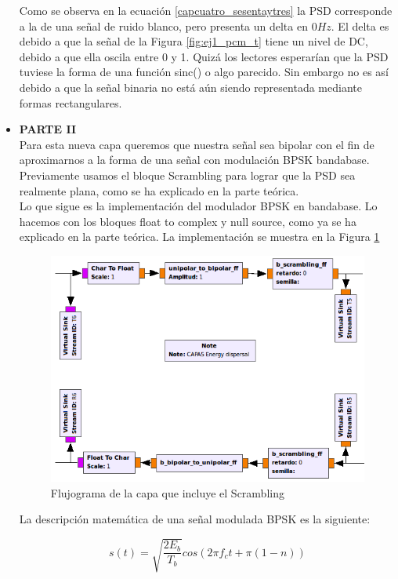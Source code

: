 \begin{itemize}
Como se observa en la ecuación \ref{capcuatro_sesentaytres} la PSD corresponde a la de una señal de ruido blanco, pero presenta un delta en $0 Hz$. El delta es debido a que la señal de la Figura \ref{fig:ej1_pcm_t} tiene un nivel de DC, debido a que ella oscila entre 0 y 1. Quizá los lectores esperarían que la PSD tuviese la forma de una función sinc() o algo parecido. Sin embargo no es así debido a que la señal binaria no está aún siendo representada mediante formas rectangulares.

\item \textbf{PARTE II}\\

Para esta nueva capa queremos que nuestra señal sea bipolar con el fin de aproximarnos a la forma de una señal con modulación BPSK bandabase. Previamente usamos el bloque Scrambling para lograr que la PSD sea realmente plana, como se ha explicado en la parte teórica. \\
Lo que sigue es la implementación del modulador BPSK en bandabase. Lo hacemos con los bloques float to complex y null source, como ya se ha explicado en la parte teórica. La implementación se muestra en la Figura \ref{fig:ej1_bpsk_flujo}\\

\vspace{200px}
\begin{figure}[h!]
	\captionsetup{justification = raggedright, singlelinecheck = false}
	\caption{Flujograma de la capa que incluye el Scrambling}
	\label{fig:ej1_bpsk_flujo}
    \includegraphics[width=0.6\linewidth]{Imagenes/T4_T5_parte1.png}
    \centering
\end{figure}

La descripción matemática de una señal modulada BPSK es la siguiente:

\begin{equation}  \label{capcuatro_sesentaycuatro}
	s(t)=	\sqrt{\frac{2E_{b}}{T_{b}}}cos(2\pi f_{c} t+\pi (1-n))	
\end{equation}


\end{itemize}
